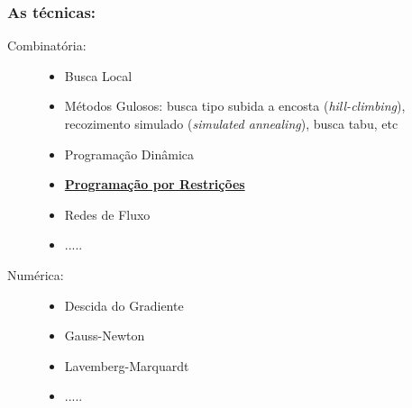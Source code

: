 \documentclass{beamer}
\begin{document}

\begin{frame}[fragile]
 \frametitle{As técnicas:} 
  
\begin{block}{}
      \begin{description}
      \item[Combinatória:]
      \begin{itemize}
           \item Busca Local
          \item Métodos Gulosos: busca tipo subida a encosta (\textit{hill-climbing}), recozimento simulado (\textit{simulated annealing}), busca tabu, etc
        \item Programação Dinâmica
        \item \underline{\textbf{Programação por Restrições}}
        \item Redes de Fluxo
        \item .....        
        \end{itemize}      
      
      \item[Numérica:]
        \begin{itemize}
        \item Descida do Gradiente 
        \item Gauss-Newton
        \item Lavemberg-Marquardt
        \item .....
      \end{itemize}      
       
    \end{description}
  \end{block}
\end{frame}
\end{document}
